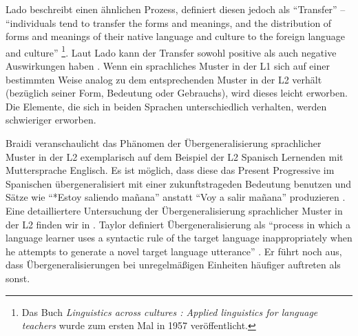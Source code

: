 Lado beschreibt einen ähnlichen Prozess, definiert diesen jedoch als ``Transfer'' --
``individuals tend to transfer the forms and meanings, and the distribution of forms and meanings of their native language and culture to the foreign language and culture'' \cite[S.2]{Lado71}
\footnote{Das Buch \textit{Linguistics across cultures : Applied linguistics
for language teachers} wurde zum ersten Mal in 1957 veröffentlicht.}.
Laut Lado kann der Transfer sowohl positive als auch negative Auswirkungen haben \cite[vgl. dazu auch][S.72]{Ellis08}.
Wenn ein sprachliches Muster in der L1 sich auf einer bestimmten Weise analog zu dem entsprechenden Muster in der L2 verhält (bezüglich seiner Form, Bedeutung oder Gebrauchs), wird dieses leicht erworben.
Die Elemente, die sich in beiden Sprachen unterschiedlich verhalten, werden schwieriger erworben.

Braidi veranschaulicht das Phänomen der Übergeneralisierung sprachlicher Muster in der L2 exemplarisch auf dem Beispiel der L2 Spanisch Lernenden mit Muttersprache Englisch.
Es ist möglich, dass diese das Present Progressive im Spanischen übergeneralisiert mit einer zukunftstrageden Bedeutung benutzen und Sätze wie ``*Estoy saliendo mañana'' anstatt ``Voy a salir mañana'' produzieren \cite[vgl.][]{Braidi99}.
Eine detailliertere Untersuchung der Übergeneralisierung sprachlicher Muster in der L2
finden wir in \cite[][]{Taylor75}.
Taylor definiert Übergeneralisierung als ``process in which a language learner uses a syntactic rule of the
target language inappropriately when he attempts to generate a novel target language utterance'' \cite[S.74]{Taylor75}.
Er führt noch aus, dass Übergeneralisierungen bei unregelmäßigen Einheiten häufiger auftreten als sonst.




